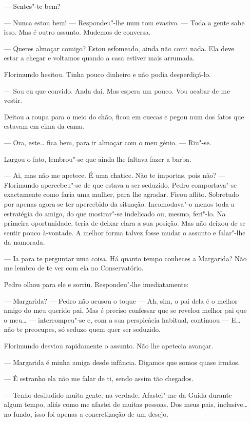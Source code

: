 --- Sentes"-te bem?

--- Nunca estou bem! --- Respondeu"-lhe num tom evasivo. --- Toda a gente sabe
isso. Mas é outro assunto. Mudemos de conversa.

--- Queres almoçar comigo? Estou esfomeado, ainda não comi nada. Ela deve
estar a chegar e voltamos quando a casa estiver mais arrumada.

Florimundo hesitou. Tinha pouco dinheiro e não podia desperdiçá-lo.

--- Sou eu que convido. Anda daí. Mas espera um pouco. Vou acabar de me
vestir.

Deitou a roupa para o meio do chão, ficou em cuecas e pegou num dos
fatos que estavam em cima da cama.

--- Ora, este\ldots{} fica bem, para ir almoçar com o meu génio. --- Riu"-se.

Largou o fato, lembrou"-se que ainda lhe faltava fazer a barba.

--- Ai, mas não me apetece. É uma chatice. Não te importas, pois não? ---
Florimundo apercebeu"-se de que estava a ser seduzido. Pedro
comportava"-se exactamente como faria uma mulher, para lhe agradar. Ficou
aflito. Sobretudo por apenas agora se ter apercebido da situação.
Incomodava"-o menos toda a estratégia do amigo, do que mostrar"-se
indelicado ou, mesmo, feri"-lo. Na primeira oportunidade, teria de deixar
clara a sua posição. Mas não deixou de se sentir pouco à-vontade. A
melhor forma talvez fosse mudar o assunto e falar"-lhe da namorada.

--- Ia para te perguntar uma coisa. Há quanto tempo conheces a Margarida?
Não me lembro de te ver com ela no Conservatório.

Pedro olhou para ele e sorriu. Respondeu"-lhe imediatamente:

--- Margarida? --- Pedro não acusou o toque --- Ah, sim, o pai dela é o melhor
amigo do meu querido pai. Mas é preciso confessar que se revelou melhor
pai que o meu\ldots{} --- interrompeu"-se e, com a sua perspicácia habitual,
continuou ---  E\ldots{} não te preocupes, só seduzo quem quer ser
seduzido.

Florimundo desviou rapidamente o assunto. Não lhe apetecia avançar.

--- Margarida é minha amiga desde infância. Digamos que somos quase
irmãos.

--- É estranho ela não me falar de ti, sendo assim tão chegados.

--- Tenho desiludido muita gente, na verdade. Afastei"-me da Guida durante
algum tempo, aliás como me afastei de muitas pessoas. Dos meus pais,
inclusive\ldots{} no fundo, isso foi apenas a concretização de um desejo.

